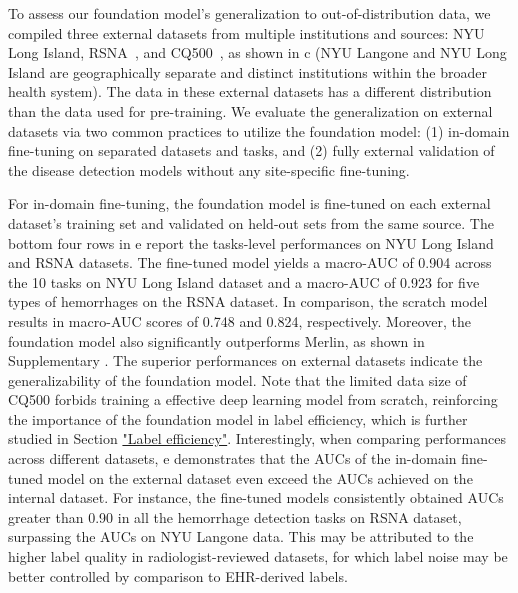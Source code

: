 \documentclass[fleqn,10pt]{wlscirep}
\begin{document}
To assess our foundation model's generalization to out-of-distribution data, we compiled three external datasets from multiple institutions and sources: NYU Long Island, RSNA~\cite{flanders_construction_2020}, and CQ500~\cite{CQ500}, as shown in c (NYU Langone and NYU Long Island are geographically separate and distinct institutions within the broader health system). The data in these external datasets has a different distribution than the data used for pre-training. We evaluate the generalization on external datasets via two common practices to utilize the foundation model: (1) in-domain fine-tuning on separated datasets and tasks, and (2) fully external validation of the disease detection models without any site-specific fine-tuning.



For in-domain fine-tuning, the foundation model is fine-tuned on each external dataset’s training set and validated on held-out sets from the same source. The bottom four rows in e report the tasks-level performances on NYU Long Island and RSNA datasets. The fine-tuned model yields a macro-AUC of 0.904 across the 10 tasks on NYU Long Island dataset and a macro-AUC of 0.923 for five types of hemorrhages on the RSNA dataset. In comparison, the scratch model results in macro-AUC scores of 0.748 and 0.824, respectively.  Moreover, the foundation model also significantly outperforms Merlin, as shown in Supplementary . The superior performances on external datasets indicate the generalizability of the foundation model. Note that the limited data size of CQ500 forbids training a effective deep learning model from scratch, reinforcing the importance of the foundation model in label efficiency, which is further studied in Section \hyperref[sec:label_efficiency]{"Label efficiency"}. Interestingly, when comparing performances across different datasets, e demonstrates that the AUCs of the in-domain fine-tuned model on the external dataset even exceed the AUCs achieved on the internal dataset. For instance, the fine-tuned models consistently obtained AUCs greater than 0.90 in all the hemorrhage detection tasks on RSNA dataset, surpassing the AUCs on NYU Langone data. This may be attributed to the higher label quality in radiologist-reviewed datasets, for which label noise may be better controlled by comparison to EHR-derived labels.
\end{document}
